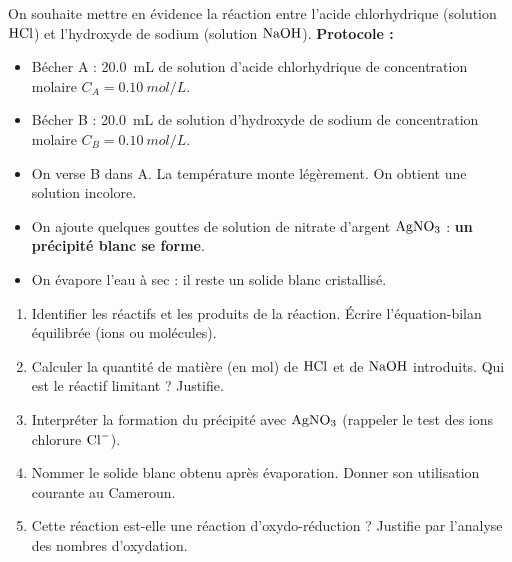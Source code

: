 \documentclass[11pt]{article}
\newcommand{\cle}[1]{{\popxbold\color{popdark}#1}}
\begin{document}
\begin{exercice}
On souhaite mettre en évidence la réaction entre l'acide chlorhydrique (solution $\ce{HCl}$) et l'hydroxyde de sodium (solution $\ce{NaOH}$).
\textbf{Protocole :}
\begin{itemize}
    \item Bécher A : \SI{20,0}{mL} de solution d'acide chlorhydrique de concentration molaire $C_A = \SI{0,10}{mol/L}$.
    \item Bécher B : \SI{20,0}{mL} de solution d'hydroxyde de sodium de concentration molaire $C_B = \SI{0,10}{mol/L}$.
    \item On verse B dans A. La température monte légèrement. On obtient une solution incolore.
    \item On ajoute quelques gouttes de solution de nitrate d'argent $\ce{AgNO3}$ : \textbf{un précipité blanc se forme}.
    \item On évapore l'eau à sec : il reste un solide blanc cristallisé.
\end{itemize}
\begin{enumerate}
    \item Identifier les \cle{réactifs} et les \cle{produits} de la réaction. Écrire l'équation-bilan équilibrée (ions ou molécules).
    \item Calculer la quantité de matière (en mol) de $\ce{HCl}$ et de $\ce{NaOH}$ introduits. Qui est le \cle{réactif limitant} ? Justifie.
    \item Interpréter la formation du précipité avec $\ce{AgNO3}$ (rappeler le test des ions chlorure $\ce{Cl-}$).
    \item Nommer le solide blanc obtenu après évaporation. Donner son utilisation courante au Cameroun.
    \item Cette réaction est-elle une réaction d'oxydo-réduction ? Justifie par l'analyse des nombres d'oxydation.
\end{enumerate}
\end{exercice}
\end{document}
